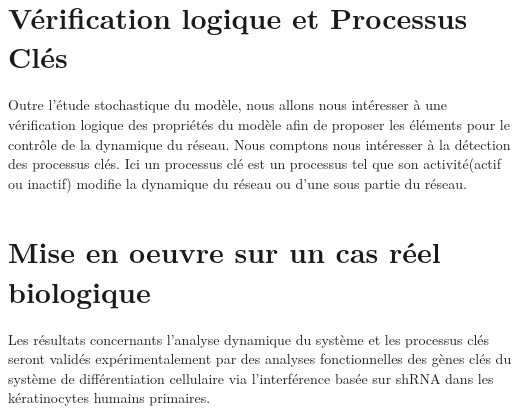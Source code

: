 \section{Vérification logique et Processus Clés} \label{sec:keyplayer}
Outre l'étude stochastique du modèle, nous allons nous intéresser à une vérification logique des propriétés du modèle afin de proposer les éléments pour le contrôle de 
la dynamique du réseau. Nous comptons nous intéresser à la détection des processus clés. Ici un processus clé est un processus tel que son activité(actif ou inactif) modifie la dynamique du réseau ou 
d'une sous partie du réseau.

\section{Mise en oeuvre sur un cas réel biologique}\label{sec:miseenoeuvre}
Les résultats concernants l'analyse dynamique du système et les processus clés seront validés expérimentalement par des analyses fonctionnelles
des gènes clés du système de différentiation cellulaire via l'interférence basée sur shRNA dans les kératinocytes humains primaires.

